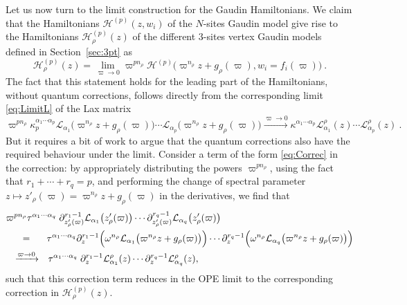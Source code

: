 \documentclass{article}
\def\Lc{\mathcal{L}}
\def\Hc{\mathcal{H}}
\begin{document}
Let us now turn to the limit construction for the Gaudin Hamiltonians. We claim that the Hamiltonians $\mathcal{H}^{(p)}(z,w_i)$ of the $N$-sites Gaudin model give rise to the Hamiltonians $\mathcal{H}^{(p)}_\rho(z)$ 
of the different 3-sites vertex Gaudin models defined in Section~\ref{sec:3pt} as 
\begin{equation}\label{eq:LimitH}
\Hc_\rho^{(p)}(z) = \lim_{\varpi \to 0} \varpi^{pn_\rho} 
\Hc^{(p)} \bigl( \varpi^{n_\rho}z + g_\rho(\varpi),w_i = f_i(\varpi) \bigr)\ .
\end{equation}
The fact that this statement holds for the leading part of the Hamiltonians, without quantum corrections, 
follows directly from the corresponding limit \eqref{eq:LimitL} of the Lax matrix
\begin{equation*}
\varpi^{pn_\rho}\kappa_p^{\alpha_1\cdots \alpha_p} \Lc_{\alpha_1}\bigl( \varpi^{n_\rho}z + g_\rho(\varpi) \bigr) 
\cdots \Lc_{\alpha_p}\bigl( \varpi^{n_\rho}z + g_\rho(\varpi) \bigr) \xrightarrow{\varpi \to 0} 
\kappa^{\alpha_1\cdots \alpha_p} \Lc_{\alpha_1}^\rho(z) \cdots \Lc_{\alpha_p}^\rho(z)\ .
\end{equation*}
But it requires a bit of work to argue that the quantum corrections also have the required behaviour 
under the limit. Consider a term of the form \eqref{eq:Correc} in the correction: by appropriately distributing the powers $\varpi^{pn_\rho}$, using the fact that $r_1 + \cdots + r_q = p$, and 
performing the change of spectral parameter $z\mapsto z'_\rho(\varpi) =  \varpi^{n_\rho}z + 
g_\rho(\varpi)$ in the derivatives, we find that
\begin{align*}
&\varpi^{pn_\rho}\tau^{\alpha_1\cdots \alpha_q} \; \partial_{z'_\rho(\varpi)}^{r_1-1}\Lc_{\alpha_1}
\bigl(z'_\rho(\varpi) \bigr)\cdots\partial_{z'_\rho(\varpi)}^{r_q-1}\Lc_{\alpha_q}\bigl(z'_\rho(\varpi) \bigr)\\
& \hspace{15pt} = \hspace{15pt}\tau^{\alpha_1\cdots\alpha_q} \partial^{r_1-1}_z \Bigl( \omega^{n_\rho} 
\Lc_{\alpha_1} \bigl(\varpi^{n_\rho}z + g_\rho(\varpi) \bigr) \Bigr) \cdots \partial^{r_q-1}_z 
\Bigl( \omega^{n_\rho} \Lc_{\alpha_q} \bigl(\varpi^{n_\rho}z + g_\rho(\varpi) \bigr) \Bigr) \\
&\hspace{7pt} \xrightarrow{\varpi \to 0}\hspace{7pt}  \tau^{\alpha_1\cdots \alpha_q} \;
\partial_z^{r_1-1}\Lc^\rho_{\alpha_1}(z)\cdots\partial_z^{r_q-1}\Lc^\rho_{\alpha_q}(z),
\end{align*}
such that this correction term reduces in the OPE limit to the corresponding correction in $\Hc_\rho^{(p)}(z)$.
\end{document}
